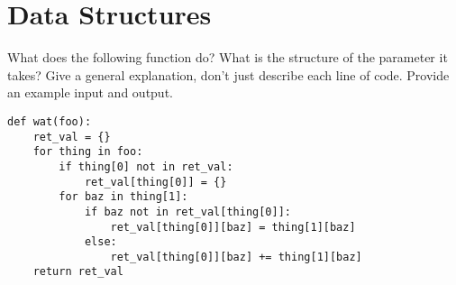 \documentclass[11pt]{article}
\begin{document}
\section{Data Structures}
What does the following function do? What is the structure of the parameter it takes? Give a general explanation, don't just describe each line of code. Provide an example input and output.
\begin{verbatim}
def wat(foo):
    ret_val = {}
    for thing in foo:
        if thing[0] not in ret_val:
            ret_val[thing[0]] = {}
        for baz in thing[1]:
            if baz not in ret_val[thing[0]]:
                ret_val[thing[0]][baz] = thing[1][baz]
            else:
                ret_val[thing[0]][baz] += thing[1][baz]
    return ret_val
\end{verbatim}
\vspace{15cm}
\end{document}
